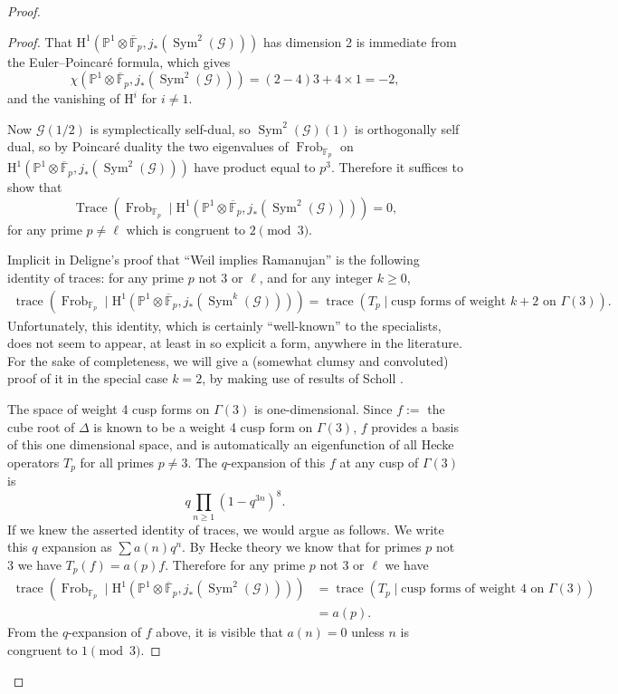 \begin{proof}
\begin{proof}
That \(\mathrm{H}^1(\mathbb{P}^1\otimes\overline{\mathbb{F}}_p,j_*(\operatorname{Sym}^2(\mathcal{G})))\) has dimension 2 is immediate from the Euler--Poincaré formula, which gives
\[
\chi(\mathbb{P}^1\otimes\overline{\mathbb{F}}_p,j_*(\operatorname{Sym}^2(\mathcal{G})))=(2-4)3+4\times1=-2,
\]
and the vanishing of \(\mathrm{H}^i\) for \(i\ne1\).

Now \(\mathcal{G}(1/2)\) is symplectically self-dual, so \(\operatorname{Sym}^2(\mathcal{G})(1)\) is orthogonally self dual, so by Poincaré duality the two eigenvalues of \(\operatorname{Frob}_{\mathbb{F}_p}\) on \(\mathrm{H}^1(\mathbb{P}^1\otimes\overline{\mathbb{F}}_p,j_*(\operatorname{Sym}^2(\mathcal{G})))\) have product equal to \(p^3\). Therefore it suffices to show that
\[
\operatorname{Trace}(\operatorname{Frob}_{\mathbb{F}_p}\mid\mathrm{H}^1(\mathbb{P}^1\otimes\overline{\mathbb{F}}_p,j_*(\operatorname{Sym}^2(\mathcal{G}))))=0,
\]
for any prime \(p\ne\ell\) which is congruent to \(2\pmod 3\).

Implicit in Deligne's proof that ``Weil implies Ramanujan'' \cite[4.8--4.9, for \(n=3\)]{De-FMRl} is the following identity of traces: for any prime \(p\) not 3 or \(\ell\), and for any integer \(k\geq0\),
\[
\begin{aligned}
\operatorname{trace}(\operatorname{Frob}_{\mathbb{F}_p}\mid\mathrm{H}^1(\mathbb{P}^1\otimes\overline{\mathbb{F}}_p,j_*(\operatorname{Sym}^k(\mathcal{G}))))
=\operatorname{trace}(T_p\mid\text{cusp forms of weight }k+2\text{ on }\Gamma(3)).
\end{aligned}
\]
Unfortunately, this identity, which is certainly ``well-known'' to the specialists, does not seem to appear, at least in so explicit a form, anywhere in the literature. For the sake of completeness, we will give a (somewhat clumsy and convoluted) proof of it in the special case \(k=2\), by making use of results of Scholl \cite{Sch}.

The space of weight 4 cusp forms on \(\Gamma(3)\) is one-dimensional. Since \(f:=\) the cube root of \(\Delta\) is known \cite[page 254]{Lang-EF} to be a weight 4 cusp form on \(\Gamma(3)\), \(f\) provides a basis of this one dimensional space, and is automatically an eigenfunction of all Hecke operators \(T_p\) for all primes \(p\ne3\). The \(q\)-expansion of this \(f\) at any cusp of \(\Gamma(3)\) is
\[
q\prod_{n\geq1}(1-q^{3n})^8.
\]
If we knew the asserted identity of traces, we would argue as follows. We write this \(q\) expansion as \(\sum a(n)q^n\). By Hecke theory we know that for primes \(p\) not 3 we have \(T_p(f)=a(p)f\). Therefore for any prime \(p\) not 3 or \(\ell\) we have
\[
\begin{aligned}
\operatorname{trace}(\operatorname{Frob}_{\mathbb{F}_p}\mid\mathrm{H}^1(\mathbb{P}^1\otimes\overline{\mathbb{F}}_p,j_*(\operatorname{Sym}^2(\mathcal{G}))))
&=\operatorname{trace}(T_p\mid\text{cusp forms of weight }4\text{ on }\Gamma(3))\\
&=a(p).
\end{aligned}
\]
From the \(q\)-expansion of \(f\) above, it is visible that \(a(n)=0\) unless \(n\) is congruent to \(1\pmod 3\).


\end{proof}
\end{proof}
